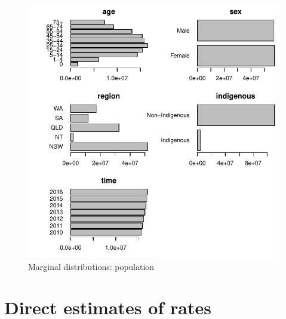 \documentclass{article}
\begin{document}
\begin{figure}
  \centering
  \includegraphics{out/fig_data_population}
  \caption{Marginal distributions: population}
\end{figure}
\newpage

\clearpage
\section{Direct estimates of rates}
\newpage
\end{document}
